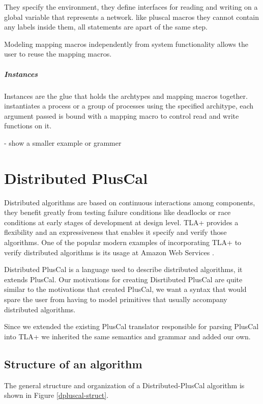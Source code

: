 \documentclass{thesul}
\begin{document}
They specify the environment, they define interfaces for reading and writing on a global variable that represents a network.
like pluscal macros they cannot contain any labels inside them, all statements are apart of the same step.

Modeling mapping macros independently from system functionality allows the user to reuse the mapping macros.

\paragraph{Instances}

Instances are the glue that holds the archtypes and mapping macros together.
instantiates a process or a group of processes using the specified architype, each argument passed is bound with a mapping macro to control read and write functions on it.

- show a smaller example or grammer

\chapter{Distributed PlusCal}


Distributed algorithms are based on continuous interactions among components, they benefit greatly from testing failure conditions like deadlocks or race conditions at early stages of development at design level.
TLA+ provides a flexibility and an expressiveness that enables it specify and verify those algorithms. One of the popular modern examples of incorporating TLA+ to verify distributed algorithms is its usage at Amazon Web Services \cite{amazon}.

Distributed PlusCal is a language used to describe distributed algorithms, it extends PlusCal. 
Our motivations for creating Disrtibuted PlusCal are quite similar to the motivations that created PlusCal, we want a syntax that would spare the user from having to model primitives that usually accompany distributed algorithms.

Since we extended the existing PlusCal translator responsible for parsing PlusCal into TLA+ we inherited the same semantics and grammar and added our own.

\section{Structure of an algorithm}

The general structure and organization of a Distributed-PlusCal algorithm is shown in Figure \ref{dpluscal-struct}.
\end{document}
